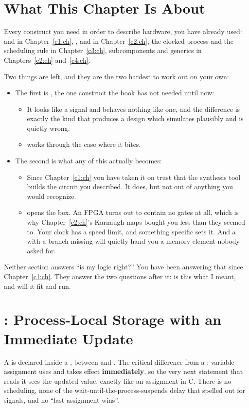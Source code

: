 
\section{What This Chapter Is About}
\label{c5:a1}
Every construct you need in order to describe hardware, you have already used:  and
 in Chapter~\ref{c1:ch}, ,  and 
in Chapter~\ref{c2:ch}, the clocked process and the scheduling rule in Chapter~\ref{c3:ch},
subcomponents and generics in Chapters~\ref{c2:ch} and~\ref{c4:ch}.

Two things are left, and they are the two hardest to work out on your own:
\begin{itemize}
  \item The first is , the one construct the book has not needed until now:
    \begin{itemize}
      \item It looks like a signal and behaves nothing like one, and the difference is exactly the
        kind that produces a design which simulates plausibly and is quietly wrong.
      \item {} works through the case where it bites.
    \end{itemize}
  \item The second is what any of this actually becomes:
    \begin{itemize}
      \item Since Chapter~\ref{c1:ch} you have taken it on trust that the synthesis tool builds the
        circuit you described. It does, but not out of anything you would recognize.
      \item {} opens the box. An FPGA turns out to contain no gates at all, which is why
        Chapter~\ref{c2:ch}'s Karnaugh maps bought you less than they seemed to. Your clock has a
        speed limit, and something specific sets it. And a  with a branch missing will
        quietly hand you a memory element nobody asked for.
    \end{itemize}
\end{itemize}
Neither section answers ``is my logic right?'' You have been answering that since
Chapter~\ref{c1:ch}. They answer the two questions after it: is this what I meant, and will it fit
and run.

\section{: Process-Local Storage with an Immediate Update}
\label{c5:a2}
A  is declared inside a , between  and
. The critical difference from a : variable assignment uses \code{:=} and
takes effect \textbf{immediately}, so the very next statement that reads it sees the updated value,
exactly like an assignment in C. There is no scheduling, none of the
wait-until-the-process-suspends delay that  spelled out for signals, and no ``last
assignment wins''.

